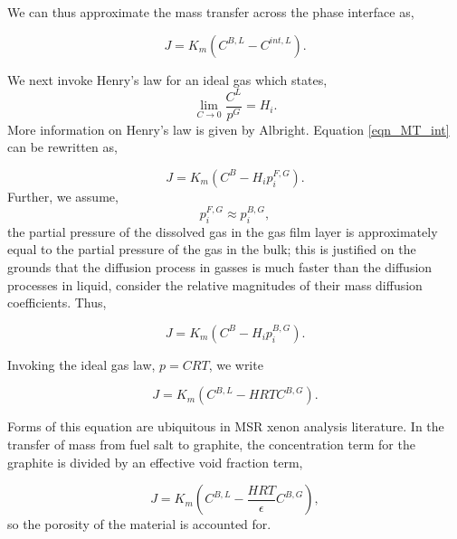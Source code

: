 We can thus approximate the mass transfer across the phase interface as,

\begin{equation}
    \label{eqn_MT_int}
    J = K_m (C^{B,L}-C^{int,L}).
\end{equation}

We next invoke Henry's law for an ideal gas which states,
\begin{equation}
    \lim_{C\to 0 }  \frac{C ^L}{p^G} = H_i.
\end{equation}
More information on Henry's law is given by Albright. \cite[p. 13]{Albright2008} Equation \ref{eqn_MT_int} can be rewritten as,

\begin{equation}
    J = K_m (C^B-H_i p_i^{F,G}).
\end{equation}
Further, we assume,
\begin{equation}
    p_i^{F,G} \approx p_i^{B,G},
\end{equation}
the partial pressure of the dissolved gas in the gas film layer is approximately equal to the partial pressure of the gas in the bulk; this is justified on the grounds that the diffusion process in gasses is much faster than the diffusion processes in liquid, consider the relative magnitudes of their mass diffusion coefficients.  Thus,

\begin{equation}
    J = K_m (C^B-H_i p_i^{B,G}).
\end{equation}

Invoking the ideal gas law, $p = CRT$, we write

\begin{equation}
    J = K_m (C^{B,L}-H RT C^{B,G}).
\end{equation}

Forms of this equation are ubiquitous in MSR xenon analysis literature.  In the transfer of mass from fuel salt to graphite, the concentration term for the graphite is divided by an effective void fraction term,

\begin{equation}
    J = K_m (C^{B,L}-\frac{H RT}\epsilon{} C^{B,G}),
\end{equation}
so the porosity of the material is accounted for.